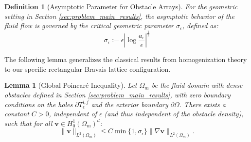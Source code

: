 \documentclass{elsarticle}
\newtheorem{lemma}{Lemma}
\newtheorem{definition}{Definition}
\begin{document}
\begin{definition}[Asymptotic Parameter for Obstacle Arrays]\label{def:asymptotic_parameter}
    For the geometric setting in Section \ref{sec:problem_main_results}, the asymptotic behavior of the fluid flow is governed by the critical geometric parameter $\sigma_{\epsilon}$, defined as:
    \begin{equation}
        \sigma_{\epsilon} := \epsilon \left| \log \frac{a_{\epsilon}}{\epsilon} \right|^{\frac{1}{2}}
    \end{equation}
\end{definition}

The following lemma generalizes the classical results from homogenization theory \cite{Allaire1991,Lu2020} to our specific rectangular Bravais lattice configuration.

\begin{lemma}[Global Poincaré Inequality]\label{lemma:poincare}
    Let $\Omega_m$ be the fluid domain with dense obstacles defined in Section \ref{sec:problem_main_results}, with zero boundary conditions on the holes $\partial T_{\epsilon}^{i,j}$ and the exterior boundary $\partial \Omega$. There exists a constant $C > 0$, independent of $\epsilon$ (and thus independent of the obstacle density), such that for all $\mathbf{v} \in H_0^1(\Omega_m)^d$:
    \begin{equation}
        \|\mathbf{v}\|_{L^2(\Omega_m)} \le C \min\{1, \sigma_{\epsilon}\} \|\nabla \mathbf{v}\|_{L^2(\Omega_m)}.
    \end{equation}
\end{lemma}
\end{document}

